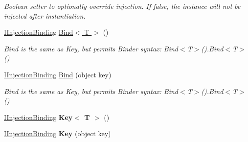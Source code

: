 \begin{DoxyCompactItemize}
\begin{DoxyCompactList}\small\item\em Boolean setter to optionally override injection. If false, the instance will not be injected after instantiation. \end{DoxyCompactList}\item 
\hypertarget{interfacestrange_1_1extensions_1_1injector_1_1api_1_1_i_injection_binding_a69d11f853421b478500e51a1f49ce189}{\hyperlink{interfacestrange_1_1extensions_1_1injector_1_1api_1_1_i_injection_binding}{I\-Injection\-Binding} \hyperlink{interfacestrange_1_1extensions_1_1injector_1_1api_1_1_i_injection_binding_a69d11f853421b478500e51a1f49ce189}{Bind$<$ T $>$} ()}\label{interfacestrange_1_1extensions_1_1injector_1_1api_1_1_i_injection_binding_a69d11f853421b478500e51a1f49ce189}

\begin{DoxyCompactList}\small\item\em Bind is the same as Key, but permits Binder syntax\-: {\ttfamily Bind$<$T$>$().Bind$<$T$>$()} \end{DoxyCompactList}\item 
\hypertarget{interfacestrange_1_1extensions_1_1injector_1_1api_1_1_i_injection_binding_a156db878da329196cb7db46768db3326}{\hyperlink{interfacestrange_1_1extensions_1_1injector_1_1api_1_1_i_injection_binding}{I\-Injection\-Binding} \hyperlink{interfacestrange_1_1extensions_1_1injector_1_1api_1_1_i_injection_binding_a156db878da329196cb7db46768db3326}{Bind} (object key)}\label{interfacestrange_1_1extensions_1_1injector_1_1api_1_1_i_injection_binding_a156db878da329196cb7db46768db3326}

\begin{DoxyCompactList}\small\item\em Bind is the same as Key, but permits Binder syntax\-: {\ttfamily Bind$<$T$>$().Bind$<$T$>$()} \end{DoxyCompactList}\item 
\hypertarget{interfacestrange_1_1extensions_1_1injector_1_1api_1_1_i_injection_binding_a2ba440297e1fb241be2a5977aef2acf0}{\hyperlink{interfacestrange_1_1extensions_1_1injector_1_1api_1_1_i_injection_binding}{I\-Injection\-Binding} {\bfseries Key$<$ T $>$} ()}\label{interfacestrange_1_1extensions_1_1injector_1_1api_1_1_i_injection_binding_a2ba440297e1fb241be2a5977aef2acf0}

\item 
\hypertarget{interfacestrange_1_1extensions_1_1injector_1_1api_1_1_i_injection_binding_a50a6cad1805b486cdbc1bfadff2494eb}{\hyperlink{interfacestrange_1_1extensions_1_1injector_1_1api_1_1_i_injection_binding}{I\-Injection\-Binding} {\bfseries Key} (object key)}\label{interfacestrange_1_1extensions_1_1injector_1_1api_1_1_i_injection_binding_a50a6cad1805b486cdbc1bfadff2494eb}


\end{DoxyCompactItemize}
